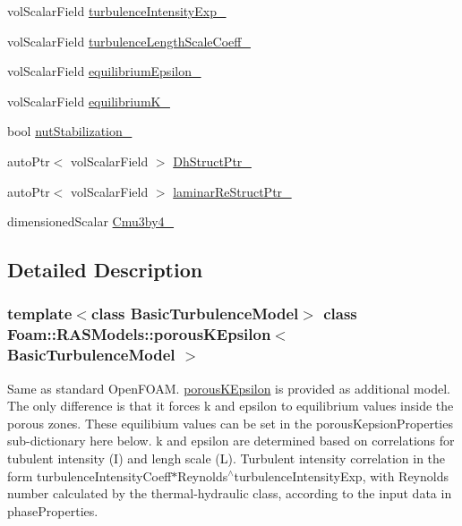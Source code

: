 \begin{DoxyCompactItemize}
\item 
vol\+Scalar\+Field \hyperlink{classFoam_1_1RASModels_1_1porousKEpsilon_af7773ce49f745897e279f657ac63804d}{turbulence\+Intensity\+Exp\+\_\+}
\item 
vol\+Scalar\+Field \hyperlink{classFoam_1_1RASModels_1_1porousKEpsilon_a49e0975310b1bba34b8505f1d8a5ae09}{turbulence\+Length\+Scale\+Coeff\+\_\+}
\item 
vol\+Scalar\+Field \hyperlink{classFoam_1_1RASModels_1_1porousKEpsilon_a3607312c86951e517e7608a5913ac67a}{equilibrium\+Epsilon\+\_\+}
\item 
vol\+Scalar\+Field \hyperlink{classFoam_1_1RASModels_1_1porousKEpsilon_ae9fc13505ce5e750d335f39a27f71cc6}{equilibrium\+K\+\_\+}
\item 
bool \hyperlink{classFoam_1_1RASModels_1_1porousKEpsilon_a43caf8f31a49744c7b3199c855ed9a4b}{nut\+Stabilization\+\_\+}
\item 
auto\+Ptr$<$ vol\+Scalar\+Field $>$ \hyperlink{classFoam_1_1RASModels_1_1porousKEpsilon_a043bc965fc5a437fbcbdf7dcc16cbdae}{Dh\+Struct\+Ptr\+\_\+}
\item 
auto\+Ptr$<$ vol\+Scalar\+Field $>$ \hyperlink{classFoam_1_1RASModels_1_1porousKEpsilon_a41c7c02bdee084f8ca2c25a56b70000d}{laminar\+Re\+Struct\+Ptr\+\_\+}
\item 
dimensioned\+Scalar \hyperlink{classFoam_1_1RASModels_1_1porousKEpsilon_ac54aba00eda376e47e9fbf9743ebe071}{Cmu3by4\+\_\+}
\end{DoxyCompactItemize}


\subsection{Detailed Description}
\subsubsection*{template$<$class Basic\+Turbulence\+Model$>$\newline
class Foam\+::\+R\+A\+S\+Models\+::porous\+K\+Epsilon$<$ Basic\+Turbulence\+Model $>$}

Same as standard Open\+F\+O\+AM. \hyperlink{classFoam_1_1RASModels_1_1porousKEpsilon}{porous\+K\+Epsilon} is provided as additional model. The only difference is that it forces k and epsilon to equilibrium values inside the porous zones. These equilibium values can be set in the porous\+Kepsion\+Properties sub-\/dictionary here below. k and epsilon are determined based on correlations for tubulent intensity (I) and lengh scale (L). Turbulent intensity correlation in the form turbulence\+Intensity\+Coeff$\ast$\+Reynolds$^\wedge$turbulence\+Intensity\+Exp, with Reynolds number calculated by the thermal-\/hydraulic class, according to the input data in phase\+Properties. 

